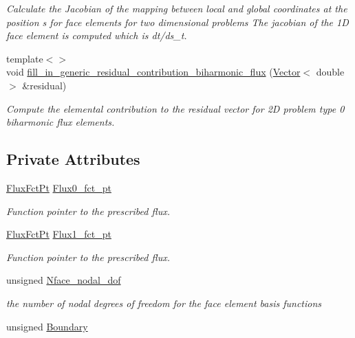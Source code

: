 \begin{DoxyCompactItemize}
\begin{DoxyCompactList}\small\item\em Calculate the Jacobian of the mapping between local and global coordinates at the position s for face elements for two dimensional problems The jacobian of the 1D face element is computed which is dt/ds\+\_\+t. \end{DoxyCompactList}\item 
{\footnotesize template$<$$>$ }\\void \hyperlink{classoomph_1_1BiharmonicFluxElement_ab01c12b941f2fdf9c5b90fb768efd40a}{fill\+\_\+in\+\_\+generic\+\_\+residual\+\_\+contribution\+\_\+biharmonic\+\_\+flux} (\hyperlink{classoomph_1_1Vector}{Vector}$<$ double $>$ \&residual)
\begin{DoxyCompactList}\small\item\em Compute the elemental contribution to the residual vector for 2D problem type 0 biharmonic flux elements. \end{DoxyCompactList}\end{DoxyCompactItemize}
\subsection*{Private Attributes}
\begin{DoxyCompactItemize}
\item 
\hyperlink{classoomph_1_1BiharmonicFluxElement_a0fafeac48951b37cf5cd86aa486945a8}{Flux\+Fct\+Pt} \hyperlink{classoomph_1_1BiharmonicFluxElement_aaf5d92538756910dfc6391f3fc9ffa7b}{Flux0\+\_\+fct\+\_\+pt}
\begin{DoxyCompactList}\small\item\em Function pointer to the prescribed flux. \end{DoxyCompactList}\item 
\hyperlink{classoomph_1_1BiharmonicFluxElement_a0fafeac48951b37cf5cd86aa486945a8}{Flux\+Fct\+Pt} \hyperlink{classoomph_1_1BiharmonicFluxElement_a2b779a5523c39071099fe87f380ecdcb}{Flux1\+\_\+fct\+\_\+pt}
\begin{DoxyCompactList}\small\item\em Function pointer to the prescribed flux. \end{DoxyCompactList}\item 
unsigned \hyperlink{classoomph_1_1BiharmonicFluxElement_a00a39afe7b520d6439a29039d3ad041a}{Nface\+\_\+nodal\+\_\+dof}
\begin{DoxyCompactList}\small\item\em the number of nodal degrees of freedom for the face element basis functions \end{DoxyCompactList}\item 
unsigned \hyperlink{classoomph_1_1BiharmonicFluxElement_a2e4afe98366a4354452fa94e79513218}{Boundary}
\end{DoxyCompactItemize}
